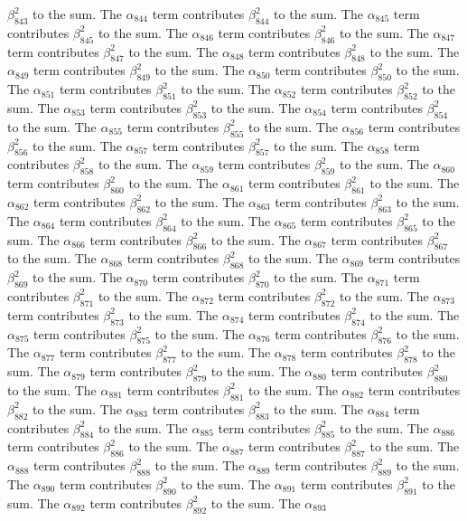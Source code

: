 \begin{lemma}
$\beta_{843}^{2}$ to the sum. The $\alpha_{844}$ term contributes $\beta_{844}^{2}$ to the sum. The $\alpha_{845}$ term contributes $\beta_{845}^{2}$ to the sum. The $\alpha_{846}$ term contributes $\beta_{846}^{2}$ to the sum. The $\alpha_{847}$ term contributes $\beta_{847}^{2}$ to the sum. The $\alpha_{848}$ term contributes $\beta_{848}^{2}$ to the sum. The $\alpha_{849}$ term contributes $\beta_{849}^{2}$ to the sum. The $\alpha_{850}$ term contributes $\beta_{850}^{2}$ to the sum. The $\alpha_{851}$ term contributes $\beta_{851}^{2}$ to the sum. The $\alpha_{852}$ term contributes $\beta_{852}^{2}$ to the sum. The $\alpha_{853}$ term contributes $\beta_{853}^{2}$ to the sum. The $\alpha_{854}$ term contributes $\beta_{854}^{2}$ to the sum. The $\alpha_{855}$ term contributes $\beta_{855}^{2}$ to the sum. The $\alpha_{856}$ term contributes $\beta_{856}^{2}$ to the sum. The $\alpha_{857}$ term contributes $\beta_{857}^{2}$ to the sum. The $\alpha_{858}$ term contributes $\beta_{858}^{2}$ to the sum. The $\alpha_{859}$ term contributes $\beta_{859}^{2}$ to the sum. The $\alpha_{860}$ term contributes $\beta_{860}^{2}$ to the sum. The $\alpha_{861}$ term contributes $\beta_{861}^{2}$ to the sum. The $\alpha_{862}$ term contributes $\beta_{862}^{2}$ to the sum. The $\alpha_{863}$ term contributes $\beta_{863}^{2}$ to the sum. The $\alpha_{864}$ term contributes $\beta_{864}^{2}$ to the sum. The $\alpha_{865}$ term contributes $\beta_{865}^{2}$ to the sum. The $\alpha_{866}$ term contributes $\beta_{866}^{2}$ to the sum. The $\alpha_{867}$ term contributes $\beta_{867}^{2}$ to the sum. The $\alpha_{868}$ term contributes $\beta_{868}^{2}$ to the sum. The $\alpha_{869}$ term contributes $\beta_{869}^{2}$ to the sum. The $\alpha_{870}$ term contributes $\beta_{870}^{2}$ to the sum. The $\alpha_{871}$ term contributes $\beta_{871}^{2}$ to the sum. The $\alpha_{872}$ term contributes $\beta_{872}^{2}$ to the sum. The $\alpha_{873}$ term contributes $\beta_{873}^{2}$ to the sum. The $\alpha_{874}$ term contributes $\beta_{874}^{2}$ to the sum. The $\alpha_{875}$ term contributes $\beta_{875}^{2}$ to the sum. The $\alpha_{876}$ term contributes $\beta_{876}^{2}$ to the sum. The $\alpha_{877}$ term contributes $\beta_{877}^{2}$ to the sum. The $\alpha_{878}$ term contributes $\beta_{878}^{2}$ to the sum. The $\alpha_{879}$ term contributes $\beta_{879}^{2}$ to the sum. The $\alpha_{880}$ term contributes $\beta_{880}^{2}$ to the sum. The $\alpha_{881}$ term contributes $\beta_{881}^{2}$ to the sum. The $\alpha_{882}$ term contributes $\beta_{882}^{2}$ to the sum. The $\alpha_{883}$ term contributes $\beta_{883}^{2}$ to the sum. The $\alpha_{884}$ term contributes $\beta_{884}^{2}$ to the sum. The $\alpha_{885}$ term contributes $\beta_{885}^{2}$ to the sum. The $\alpha_{886}$ term contributes $\beta_{886}^{2}$ to the sum. The $\alpha_{887}$ term contributes $\beta_{887}^{2}$ to the sum. The $\alpha_{888}$ term contributes $\beta_{888}^{2}$ to the sum. The $\alpha_{889}$ term contributes $\beta_{889}^{2}$ to the sum. The $\alpha_{890}$ term contributes $\beta_{890}^{2}$ to the sum. The $\alpha_{891}$ term contributes $\beta_{891}^{2}$ to the sum. The $\alpha_{892}$ term contributes $\beta_{892}^{2}$ to the sum. The $\alpha_{893}$ 
\end{lemma}

